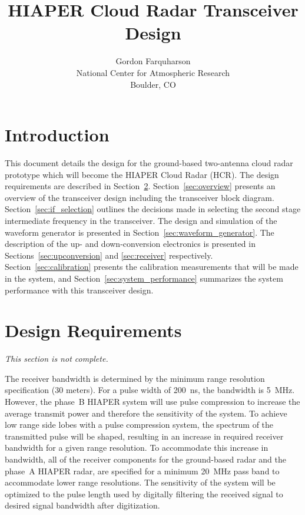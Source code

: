 \documentclass[12pt,letterpaper]{article}
\begin{document}

\title{HIAPER Cloud Radar Transceiver Design}
\author{Gordon Farquharson\\
National Center for Atmospheric Research\\
Boulder, CO}
\maketitle

\section{Introduction}

This document details the design for the ground-based two-antenna
cloud radar prototype which will become the HIAPER Cloud Radar
(HCR). The design requirements are described in
Section~\ref{sec:design_requirements}. Section~\ref{sec:overview}
presents an overview of the transceiver design including the
transceiver block diagram. Section~\ref{sec:if_selection} outlines the
decisions made in selecting the second stage intermediate frequency in
the transceiver. The design and simulation of the waveform generator
is presented in Section~\ref{sec:waveform_generator}. The description
of the up- and down-conversion electronics is presented in
Sections~\ref{sec:upconversion} and \ref{sec:receiver}
respectively. Section~\ref{sec:calibration} presents the calibration
measurements that will be made in the system, and
Section~\ref{sec:system_performance} summarizes the system performance
with this transceiver design.

\section{Design Requirements}
\label{sec:design_requirements}

\textit{This section is not complete.}

The receiver bandwidth is determined by the minimum range resolution
specification (30 meters). For a pulse width of 200~ns, the bandwidth
is 5~MHz. However, the phase~B HIAPER system will use pulse
compression to increase the average transmit power and therefore the
sensitivity of the system. To achieve low range side lobes with a
pulse compression system, the spectrum of the transmitted pulse will
be shaped, resulting in an increase in required receiver bandwidth for
a given range resolution. To accommodate this increase in bandwidth,
all of the receiver components for the ground-based radar and the
phase~A HIAPER radar, are specified for a minimum 20~MHz pass band to
accommodate lower range resolutions. The sensitivity of the system
will be optimized to the pulse length used by digitally filtering the
received signal to desired signal bandwidth after digitization.
\end{document}
